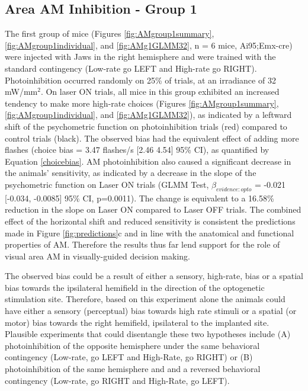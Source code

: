 \subsection{Area AM Inhibition - Group 1}
The first group of mice (Figures \ref{fig:AMgroup1summary}, \ref{fig:AMgroup1individual}, and \ref{fig:AMg1GLMM32}, n = 6 mice, Ai95;Emx-cre) were injected with Jaws in the right hemisphere and were trained with the standard contingency (Low-rate go LEFT and High-rate go RIGHT). Photoinhibition occurred randomly on 25\% of trials, at an irradiance of 32 mW/mm$^{2}$. On laser ON trials, all mice in this group exhibited an increased tendency to make more high-rate choices (Figures \ref{fig:AMgroup1summary}, \ref{fig:AMgroup1individual}, and \ref{fig:AMg1GLMM32}), as indicated by a leftward shift of the psychometric function on photoinhibition trials (red) compared to control trials (black). The observed bias had the equivalent effect of adding more flashes (choice bias = 3.47 flashes/s [2.46 4.54] 95\% CI), as quantified by Equation \ref{choicebias}. AM photoinhibition also caused a significant decrease in the animals' sensitivity, as indicated by a decrease in the slope of the psychometric function on Laser ON trials (GLMM Test, $\beta_{evidence:opto}$ = -0.021 [-0.034, -0.0085] 95\% CI, p=0.0011). The change is equivalent to a 16.58\% reduction in the slope on Laser ON compared to Laser OFF trials. The combined effect of the horizontal shift and reduced sensitivity is consistent the predictions made in Figure \ref{fig:predictions}c and in line with the anatomical and functional properties of AM. Therefore the results thus far lend support for the role of visual area AM in visually-guided decision making. \par 

The observed bias could be a result of either a sensory, high-rate, bias or a spatial bias towards the ipsilateral hemifield in the direction of the optogenetic stimulation site. Therefore, based on this experiment alone the animals could have either a sensory (perceptual) bias towards high rate stimuli or a spatial (or motor) bias towards the right hemifield, ipsilateral to the implanted site. Plausible experiments that could disentangle these two hypotheses include (A) photoinhibition of the opposite hemisphere under the same behavioral contingency (Low-rate, go LEFT and High-Rate, go RIGHT) or (B) photoinhibition of the same hemisphere and and a reversed behavioral contingency (Low-rate, go RIGHT and High-Rate, go LEFT).\par

